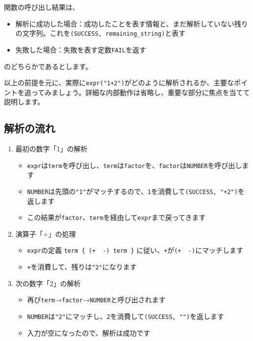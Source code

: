 関数の呼び出し結果は、

\begin{itemize}
\item
  解析に成功した場合：成功したことを表す情報と、まだ解析していない残りの文字列。これを\texttt{(SUCCESS,\ remaining\_string)}と表す
\item
  失敗した場合：失敗を表す定数\texttt{FAIL}を返す
\end{itemize}

\noindent のどちらかであるとします。

以上の前提を元に、実際に\texttt{expr("1+2")}がどのように解析されるか、主要なポイントを追ってみましょう。詳細な内部動作は省略し、重要な部分に焦点を当てて説明します。

\subsection{解析の流れ}

\begin{enumerate}
\item
  最初の数字「1」の解析

\begin{itemize}
\item
  \texttt{expr}は\texttt{term}を呼び出し、\texttt{term}は\texttt{factor}を、\texttt{factor}は\texttt{NUMBER}を呼び出します
\item
  \texttt{NUMBER}は先頭の\texttt{"1"}がマッチするので、\texttt{1}を消費して\texttt{(SUCCESS,\ "+2")}を返します
\item
  この結果が\texttt{factor}、\texttt{term}を経由して\texttt{expr}まで戻ってきます
\end{itemize}

\item
  演算子「+」の処理

\begin{itemize}
\item
  \texttt{expr}の定義
  \texttt{term\ \{\ (\textquotesingle{}+\textquotesingle{}\ \textbar{}\ \textquotesingle{}-\textquotesingle{})\ term\ \}}
  に従い、\texttt{+}が\texttt{(\textquotesingle{}+\textquotesingle{}\ \textbar{}\ \textquotesingle{}-\textquotesingle{})}にマッチします
\item
  \texttt{+}を消費して、残りは\texttt{"2"}になります
\end{itemize}

\item
  次の数字「2」の解析

\begin{itemize}
\item
  再び\texttt{term}→\texttt{factor}→\texttt{NUMBER}と呼び出されます
\item
  \texttt{NUMBER}は\texttt{"2"}にマッチし、\texttt{2}を消費して\texttt{(SUCCESS,\ "")}を返します
\item
  入力が空になったので、解析は成功です
\end{itemize}
\end{enumerate}

